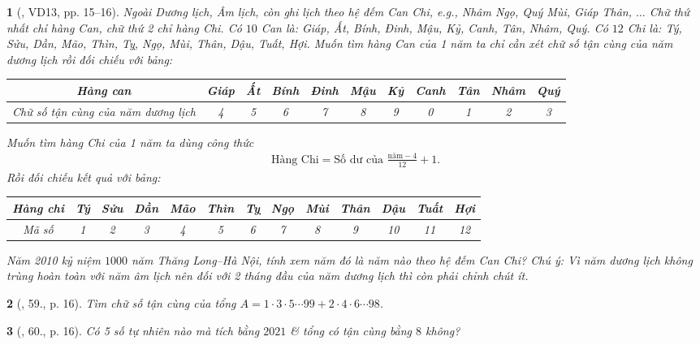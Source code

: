 \documentclass{article}
\newtheorem{baitoan}{}
\begin{document}
\begin{baitoan}[\cite{Tuyen_Toan_6}, VD13, pp. 15--16]
	Ngoài Dương lịch, Âm lịch, còn ghi lịch theo hệ đếm Can Chi, e.g., Nhâm Ngọ, Quý Mùi, Giáp Thân, $\ldots$ Chữ thứ nhất chỉ hàng Can, chữ thứ 2 chỉ hàng Chi. Có $10$ Can là: Giáp, Ất, Bính, Đinh, Mậu, Kỷ, Canh, Tân, Nhâm, Quý. Có $12$ Chi là: Tý, Sửu, Dần, Mão, Thìn, Tỵ, Ngọ, Mùi, Thân, Dậu, Tuất, Hợi. Muốn tìm hàng Can của 1 năm ta chỉ cần xét chữ số tận cùng của năm dương lịch rồi đối chiếu với bảng:
	\begin{table}[H]
		\centering
		\begin{tabular}{|c|c|c|c|c|c|c|c|c|c|c|}
			\hline
			Hàng can & Giáp & Ất & Bính & Đinh & Mậu & Kỷ & Canh & Tân & Nhâm & Quý \\
			\hline
			Chữ số tận cùng của năm dương lịch & 4 & 5 & 6 & 7 & 8 & 9 & 0 & 1 & 2 & 3 \\
			\hline
		\end{tabular}
	\end{table}
	Muốn tìm hàng Chi của 1 năm ta dùng công thức
	\begin{align*}
		\mbox{Hàng Chi} = \mbox{Số dư của }\frac{\mbox{năm} - 4}{12} + 1.
	\end{align*}
	Rồi đối chiếu kết quả với bảng:
	\begin{table}[H]
		\centering
		\begin{tabular}{|c|c|c|c|c|c|c|c|c|c|c|c|c|}
			\hline
			Hàng chi & Tý & Sửu & Dần & Mão & Thìn & Tỵ & Ngọ & Mùi & Thân & Dậu & Tuất & Hợi \\
			\hline
			Mã số & 1 & 2 & 3 & 4 & 5 & 6 & 7 & 8 & 9 & 10 & 11 & 12 \\
			\hline
		\end{tabular}
	\end{table}
	Năm 2010 kỷ niệm $1000$ năm Thăng Long--Hà Nội, tính xem năm đó là năm nào theo hệ đếm Can Chi? Chú ý: Vì năm dương lịch không trùng hoàn toàn với năm âm lịch nên đối với 2 tháng đầu của năm dương lịch thì còn phải chỉnh chút ít.
\end{baitoan}

\begin{baitoan}[\cite{Tuyen_Toan_6}, 59., p. 16]
	Tìm chữ số tận cùng của tổng $A = 1\cdot3\cdot5\cdots99 + 2\cdot4\cdot6\cdots98$.
\end{baitoan}

\begin{baitoan}[\cite{Tuyen_Toan_6}, 60., p. 16]
	Có 5 số tự nhiên nào mà tích bằng $2021$ \& tổng có tận cùng bằng $8$ không?
\end{baitoan}
\end{document}
